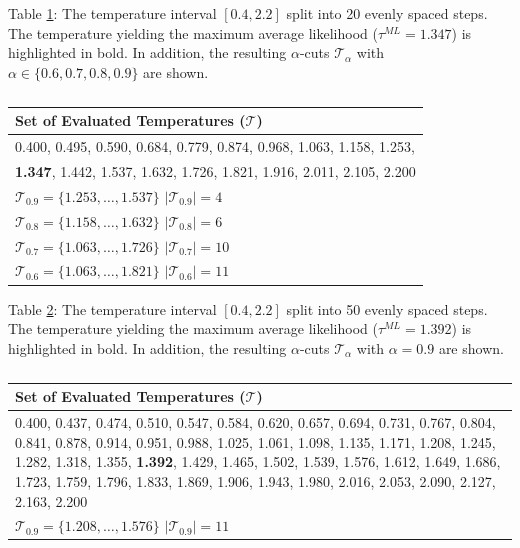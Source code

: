 Table \ref{tab:twenty_steps_interval}:
The temperature interval $[0.4, 2.2]$ split into 20 evenly spaced steps. The
temperature yielding the maximum average likelihood ($\tau^{ML} = 1.347$) is
highlighted in bold. In addition, the resulting $\alpha$-cuts
$\mathcal{T}_\alpha$ with $\alpha \in \{0.6, 0.7, 0.8, 0.9\}$ are shown.
\begin{table}[h]
    \centering
    \begin{tabular}{p{}}
    \toprule
    \textbf{Set of Evaluated Temperatures ($\mathcal{T}$)} \\
    \midrule
    0.400, 0.495, 0.590, 0.684, 0.779, 0.874, 0.968, 1.063, 1.158, 
    1.253, \\
    \textbf{1.347}, 1.442, 1.537, 1.632, 1.726, 1.821, 1.916, 2.011, 2.105, 2.200 \\
    \midrule
    $\mathcal{T}_{0.9} = \{ 1.253, \dots, 1.537\}$ \quad \quad
    $|\mathcal{T}_{0.9}| = 4$ \\
    $\mathcal{T}_{0.8} = \{ 1.158, \dots, 1.632 \}$ \quad \quad
    $|\mathcal{T}_{0.8}| = 6$ \\
    $\mathcal{T}_{0.7} = \{ 1.063, \dots, 1.726 \}$ \quad \quad
    $|\mathcal{T}_{0.7}| = 10$ \\
    $\mathcal{T}_{0.6} = \{ 1.063, \dots, 1.821\}$ \quad \quad
    $|\mathcal{T}_{0.6}| = 11$ \\
    \bottomrule
    \end{tabular}
    \caption{}
    \label{tab:twenty_steps_interval}
\end{table}

Table \ref{tab:fifty_steps_interval}:
The temperature interval $[0.4, 2.2]$ split into 50 evenly spaced steps. The
temperature yielding the maximum average likelihood ($\tau^{ML} = 1.392$) is
highlighted in bold. In addition, the resulting $\alpha$-cuts
$\mathcal{T}_\alpha$ with $\alpha=0.9$ are shown.
\begin{table}[h]
    \centering
    \begin{tabular}{p{}}
    \toprule
    \textbf{Set of Evaluated Temperatures ($\mathcal{T}$)} \\
    \midrule
    0.400, 0.437, 0.474, 0.510, 0.547, 0.584, 0.620, 0.657, 0.694, 0.731, 
    0.767, 0.804, 0.841, 0.878, 0.914, 0.951, 0.988, 1.025, 1.061, 1.098, 
    1.135, 1.171, 1.208, 1.245, 1.282, 1.318, 1.355, \textbf{1.392}, 1.429, 1.465, 
    1.502, 1.539, 1.576, 1.612, 1.649, 1.686, 1.723, 1.759, 1.796, 1.833, 
    1.869, 1.906, 1.943, 1.980, 2.016, 2.053, 2.090, 2.127, 2.163, 2.200 \\
    \midrule
    $\mathcal{T}_{0.9} = \{ 1.208, \dots, 1.576 \}$ \quad \quad
    $|\mathcal{T}_{0.9}| = 11$\\
    \bottomrule
    \end{tabular}
    \caption{}
    \label{tab:fifty_steps_interval}
\end{table}
